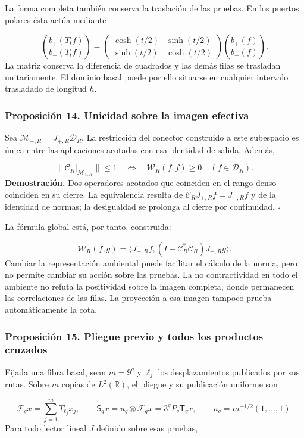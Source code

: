 La forma completa también conserva la traslación de las pruebas. En los puertos polares ésta actúa mediante

\[
\binom{b_+(T_tf)}{b_-(T_tf)}=
\begin{pmatrix}\cosh(t/2)&\sinh(t/2)\\
\sinh(t/2)&\cosh(t/2)\end{pmatrix}
\binom{b_+(f)}{b_-(f)}.
\]
La matriz conserva la diferencia de cuadrados y las demás filas se trasladan unitariamente. El dominio basal puede por ello situarse en cualquier intervalo trasladado de longitud \(h\).

\subsubsection*{Proposición 14. Unicidad sobre la imagen efectiva}
Sea \(\mathcal M_{+,R}=\overline{J_{+,R}\mathcal D_R}\). La restricción del conector construido a este subespacio es única entre las aplicaciones acotadas con esa identidad de salida. Además,

\[
\|\mathcal C_R|_{\mathcal M_{+,R}}\|\leq1
\quad\Longleftrightarrow\quad
\mathscr W_R(f,f)\geq0\quad(f\in\mathcal D_R).
\]
\textbf{Demostración.} Dos operadores acotados que coinciden en el rango denso coinciden en su cierre. La equivalencia resulta de \(\mathcal C_RJ_{+,R}f=J_{-,R}f\) y de la identidad de normas; la desigualdad se prolonga al cierre por continuidad. \hfill\(\square\)

La fórmula global está, por tanto, construida:

\[
\mathscr W_R(f,g)=
\langle J_{+,R}f,(I-\mathcal C_R^*\mathcal C_R)J_{+,R}g\rangle.
\]
Cambiar la representación ambiental puede facilitar el cálculo de la norma, pero no permite cambiar su acción sobre las pruebas. La no contractividad en todo el ambiente no refuta la positividad sobre la imagen completa, donde permanecen las correlaciones de las filas. La proyección a esa imagen tampoco prueba automáticamente la cota.

\subsubsection*{Proposición 15. Pliegue previo y todos los productos cruzados}
Fijada una fibra basal, sean \(m=9^q\) y \(\ell_j\) los desplazamientos publicados por sus rutas. Sobre \(m\) copias de \(L^2(\mathbb R)\), el pliegue y su publicación uniforme son

\[
\mathcal F_qx=\sum_{j=1}^mT_{\ell_j}x_j,\qquad
\mathsf S_qx=u_q\otimes\mathcal F_qx=3^qP_q\mathsf T_qx,
\qquad u_q=m^{-1/2}(1,\ldots,1).
\]
Para todo lector lineal \(J\) definido sobre esas pruebas,

